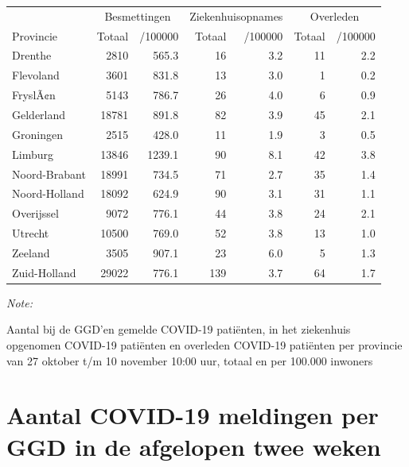 \documentclass[
  english,
  man,floatsintext]{apa6}
\begin{document}
\begin{table}
\centering
\begin{threeparttable}
\begin{tabular}{lrrrrrr}
\toprule
\multicolumn{1}{c}{ } & \multicolumn{2}{c}{Besmettingen} & \multicolumn{2}{c}{Ziekenhuisopnames} & \multicolumn{2}{c}{Overleden} \\
\cmidrule(l{3pt}r{3pt}){2-3} \cmidrule(l{3pt}r{3pt}){4-5} \cmidrule(l{3pt}r{3pt}){6-7}
Provincie & Totaal & /100000 & Totaal & /100000 & Totaal & /100000\\
\midrule
Drenthe & 2810 & 565.3 & 16 & 3.2 & 11 & 2.2\\
Flevoland & 3601 & 831.8 & 13 & 3.0 & 1 & 0.2\\
FryslÃ¢n & 5143 & 786.7 & 26 & 4.0 & 6 & 0.9\\
Gelderland & 18781 & 891.8 & 82 & 3.9 & 45 & 2.1\\
Groningen & 2515 & 428.0 & 11 & 1.9 & 3 & 0.5\\
Limburg & 13846 & 1239.1 & 90 & 8.1 & 42 & 3.8\\
Noord-Brabant & 18991 & 734.5 & 71 & 2.7 & 35 & 1.4\\
Noord-Holland & 18092 & 624.9 & 90 & 3.1 & 31 & 1.1\\
Overijssel & 9072 & 776.1 & 44 & 3.8 & 24 & 2.1\\
Utrecht & 10500 & 769.0 & 52 & 3.8 & 13 & 1.0\\
Zeeland & 3505 & 907.1 & 23 & 6.0 & 5 & 1.3\\
Zuid-Holland & 29022 & 776.1 & 139 & 3.7 & 64 & 1.7\\
\bottomrule
\end{tabular}
\begin{tablenotes}
\item \textit{Note: } 
\item Aantal bij de GGD’en gemelde COVID-19 patiënten, in het ziekenhuis opgenomen COVID-19 patiënten en overleden COVID-19 patiënten per provincie van 27 oktober t/m 10 november 10:00 uur, totaal en per 100.000 inwoners
\end{tablenotes}
\end{threeparttable}
\end{table}

\newpage

\hypertarget{aantal-covid-19-meldingen-per-ggd-in-de-afgelopen-twee-weken}{%
\section{Aantal COVID-19 meldingen per GGD in de afgelopen twee weken}\label{aantal-covid-19-meldingen-per-ggd-in-de-afgelopen-twee-weken}}
\end{document}

